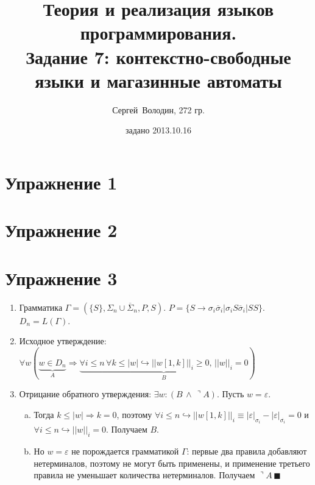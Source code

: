 \documentclass[a4paper]{article}
\title{Теория и реализация языков программирования.\\Задание 7: контекстно-свободные языки и магазинные автоматы}
\date{задано 2013.10.16}
\author{Сергей~Володин, 272 гр.}
\begin{document}
\maketitle
\section*{Упражнение 1}
\section*{Упражнение 2}
\section*{Упражнение 3}
\begin{enumerate}[1.]
\item Грамматика $\Gamma=(\{S\},\Sigma_n\cup\overline{\Sigma}_n,P,S)$. $P=\big\{S\longrightarrow \sigma_i\overline{\sigma}_i|\sigma_iS\overline{\sigma}_i|SS\big\}$. $D_n=L(\Gamma)$.
\item Исходное утверждение: $\forall w\left(\underbrace{w\in D_n}_{A}\Rightarrow\underbrace{\forall i\leqslant n\,\forall k\leqslant |w|\hookrightarrow ||w[1,k]||_i\geqslant 0,\,||w||_i=0}_{B}\right)$
\item Отрицание обратного утверждения: $\exists w\colon \left(B\,\wedge\,\urcorner A\right)$. Пусть $w=\varepsilon$.\begin{enumerate}[a.]
\item Тогда $k\leqslant |w|\Rightarrow k=0$, поэтому $\forall i\leqslant n\hookrightarrow ||w[1,k]||_i\equiv|\varepsilon|_{\sigma_i}-|\varepsilon|_{\overline{\sigma_i}}=0$ и $\forall i\leqslant n\hookrightarrow||w||_i=0$. Получаем $B$.
\item Но $w=\varepsilon$ не порождается грамматикой $\Gamma$: первые два правила добавляют нетерминалов, поэтому не могут быть применены, и применение третьего правила не уменьшает количества нетерминалов. Получаем $\urcorner A\,\blacksquare$
\end{enumerate}
\end{enumerate}
\end{document}

